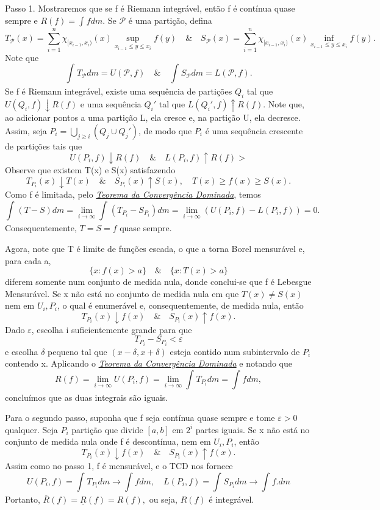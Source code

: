 \documentclass[measure_theory.tex]{subfiles}
\begin{document}
\begin{proof*}
	Passo 1. Mostraremos que se f é Riemann integrável, então f é contínua quase sempre e \(R(f) = \int_{}f dm.\) Se \(\mathcal{P}\) é uma partição, defina
	\[
		T_{\mathcal{P}}(x) = \sum\limits_{i=1}^{n}\chi_{[x_{i-1}, x_{i})}(x)\sup_{x_{i-1}\leq y\leq x_{i}}f(y) \quad\&\quad S_{\mathcal{P}}(x) = \sum\limits_{i=1}^{n}\chi_{[x_{i-1}, x_{i})}(x)\inf_{x_{i-1}\leq y\leq x_{i}}f(y).
	\]
	Note que
	\[
		\int_{}T_{\mathcal{P}} dm = U(\mathcal{P}, f) \quad\&\quad \int_{}S_{\mathcal{P}} dm = L(\mathcal{P}, f).
	\]
	Se f é Riemann integrável, existe uma sequência de partições \(Q_{i}\) tal que \(U(Q_{i}, f)\downarrow R(f)\) e uma sequência \(Q_{i}'\) tal que \(L(Q_{i}', f)\uparrow R(f).\) Note que, ao adicionar pontos a uma partição L, ela cresce e,
	na partição U, ela decresce. Assim, seja \(P_{i} = \bigcup_{j\geq i}^{}(Q_{j}\cup Q_{j}')\), de modo que \(P_{i}\) é uma sequência crescente de partições tais que
	\[
		U(P_{i}, f)\downarrow R(f)\quad\&\quad L(P_{i}, f)\uparrow R(f)>
	\]
	Observe que existem T(x) e S(x) satisfazendo
	\[
		T_{P_{i}}(x)\downarrow T(x) \quad\&\quad S_{P_{i}}(x)\uparrow S(x),\quad T(x)\geq f(x)\geq S(x).
	\]
	Como f é limitada, pelo \hyperlink{dominated_convergence}{\textit{Teorema da Convergência Dominada}}, temos
	\[
		\int_{}(T-S) dm = \lim_{i\to \infty}\int_{}(T_{P_{i}} - S_{P_{i}}) dm = \lim_{i\to \infty}(U(P_{i}, f) - L(P_{i}, f)) = 0.
	\]
	Consequentemente, \(T = S = f\) quase sempre.

	Agora, note que T é limite de funções escada, o que a torna Borel mensurável e, para cada a,
	\[
		\{x:f(x)>a\}\quad\&\quad \{x:T(x)>a\}
	\]
	diferem somente num conjunto de medida nula, donde conclui-se que f é Lebesgue Mensurável. Se x não está no conjunto de medida nula em que \(T(x)\neq S(x)\) nem em \(U_{i}, P_{i}\),
	o qual é enumerável e, consequentemente, de medida nula, então
	\[
		T_{P_{i}}(x)\downarrow f(x) \quad\&\quad S_{P_{i}}(x)\uparrow f(x).
	\]
	Dado \(\varepsilon \), escolha i suficientemente grande para que
	\[
		T_{P_{i}} - S_{P_{i}} < \varepsilon
	\]
	e escolha \(\delta \) pequeno tal que \((x-\delta , x+\delta )\) esteja contido num subintervalo de \(P_{i}\) contendo x. Aplicando o \hyperlink{dominated_convergence}{\textit{Teorema da Convergência Dominada}} e notando que
	\[
		R(f) = \lim_{i\to \infty}U(P_{i}, f) = \lim_{i\to \infty}\int_{}T_{P_{i}} dm = \int_{}f dm,
	\]
	concluímos que as duas integrais são iguais.

	Para o segundo passo, suponha que f seja contínua quase sempre e tome \(\varepsilon >0\) qualquer. Seja \(P_{i}\) partição que divide \([a, b]\) em \(2^{i}\) partes iguais. Se x não está no conjunto de medida nula onde f é descontínua, nem
	em \(U_{i}, P_{i}\), então
	\[
		T_{P_{i}}(x)\downarrow f(x)\quad\&\quad S_{P_{i}}(x)\uparrow f(x).
	\]
	Assim como no passo 1, f é mensurável, e o TCD nos fornece
	\[
		U(P_{i}, f) = \int_{}T_{P_{i}} dm\to \int_{}f dm,\quad L(P_{i}, f) = \int_{}S_{P_{i}} dm\to \int_{}f. dm
	\]
	Portanto, \(\overline{R}(f) = \underline{R}(f) = R(f),\) ou seja, \(R(f)\) é integrável. \qedsymbol
\end{proof*}
\end{document}
